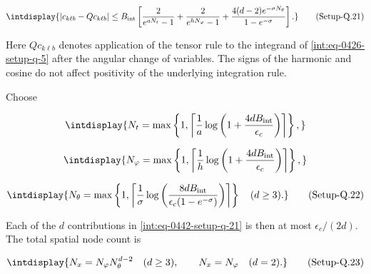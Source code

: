\label{int:eq-setup-q-21}
\begingroup\renewcommand{\theHequation}{intdisplay.892}
\begin{equation}
\intdisplay{
|c_{k\ell b}-Q c_{k\ell b}|
\le B_{\rm int}\left[
\frac2{e^{aN_t}-1}+\frac2{e^{hN_\varphi}-1}
+\frac{4(d-2)e^{-\sigma N_\theta}}{1-e^{-\sigma}}
\right].
}
\tag{Setup-Q.21}
\label{int:eq-0442-setup-q-21}
\end{equation}
\endgroup


Here \(Q c_{k\ell b}\) denotes application of the tensor rule to the integrand of \hyperref[int:eq-setup-q-5]{\eqref{int:eq-0426-setup-q-5}} after the angular change of variables. The signs of the harmonic and cosine do not affect positivity of the underlying integration rule.



Choose


\begingroup\renewcommand{\theHequation}{intdisplay.893}
\begin{equation*}
\intdisplay{
N_t=\max\left\{1,
\left\lceil\frac1a\log\left(1+\frac{4dB_{\rm int}}{\epsilon_c}\right)
\right\rceil\right\},
}
\end{equation*}
\endgroup

\begingroup\renewcommand{\theHequation}{intdisplay.894}
\begin{equation*}
\intdisplay{
N_\varphi=\max\left\{1,
\left\lceil\frac1h\log\left(1+\frac{4dB_{\rm int}}{\epsilon_c}\right)
\right\rceil\right\},
}
\end{equation*}
\endgroup

\label{int:eq-setup-q-22}
\begingroup\renewcommand{\theHequation}{intdisplay.895}
\begin{equation}
\intdisplay{
N_\theta=\max\left\{1,
\left\lceil\frac1\sigma
\log\left(\frac{8dB_{\rm int}}
{\epsilon_c(1-e^{-\sigma})}\right)\right\rceil\right\}
\quad(d\ge3).
}
\tag{Setup-Q.22}
\label{int:eq-0443-setup-q-22}
\end{equation}
\endgroup


Each of the \(d\) contributions in \hyperref[int:eq-setup-q-21]{\eqref{int:eq-0442-setup-q-21}} is then at most \(\epsilon_c/(2d)\). The total spatial node count is


\label{int:eq-setup-q-23}
\begingroup\renewcommand{\theHequation}{intdisplay.896}
\begin{equation}
\intdisplay{
N_x=N_\varphi N_\theta^{d-2}\quad(d\ge3),
\qquad N_x=N_\varphi\quad(d=2).
}
\tag{Setup-Q.23}
\label{int:eq-0444-setup-q-23}
\end{equation}
\endgroup

